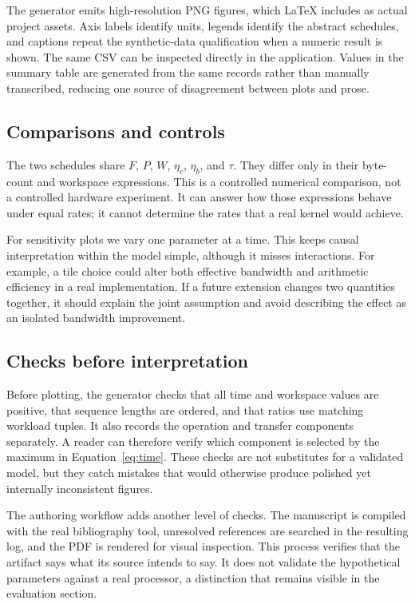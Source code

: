 The generator emits high-resolution PNG figures, which LaTeX includes as actual project assets. Axis labels identify units, legends identify the abstract schedules, and captions repeat the synthetic-data qualification when a numeric result is shown. The same CSV can be inspected directly in the application. Values in the summary table are generated from the same records rather than manually transcribed, reducing one source of disagreement between plots and prose.

\subsection{Comparisons and controls}
The two schedules share $F$, $P$, $W$, $\eta_c$, $\eta_b$, and $\tau$. They differ only in their byte-count and workspace expressions. This is a controlled numerical comparison, not a controlled hardware experiment. It can answer how those expressions behave under equal rates; it cannot determine the rates that a real kernel would achieve.

For sensitivity plots we vary one parameter at a time. This keeps causal interpretation within the model simple, although it misses interactions. For example, a tile choice could alter both effective bandwidth and arithmetic efficiency in a real implementation. If a future extension changes two quantities together, it should explain the joint assumption and avoid describing the effect as an isolated bandwidth improvement.

\subsection{Checks before interpretation}
Before plotting, the generator checks that all time and workspace values are positive, that sequence lengths are ordered, and that ratios use matching workload tuples. It also records the operation and transfer components separately. A reader can therefore verify which component is selected by the maximum in Equation~\ref{eq:time}. These checks are not substitutes for a validated model, but they catch mistakes that would otherwise produce polished yet internally inconsistent figures.

The authoring workflow adds another level of checks. The manuscript is compiled with the real bibliography tool, unresolved references are searched in the resulting log, and the PDF is rendered for visual inspection. This process verifies that the artifact says what its source intends to say. It does not validate the hypothetical parameters against a real processor, a distinction that remains visible in the evaluation section.
